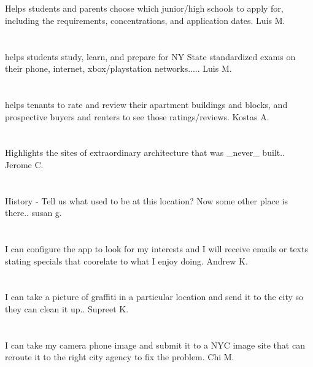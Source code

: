 \section{}Helps students and parents choose which junior/high schools to apply for,  including the requirements,  concentrations,  and application dates. Luis M.
\section{}helps students study,  learn,  and prepare for NY State standardized exams on their phone,  internet,  xbox/playstation networks..... Luis M.
\section{}helps tenants to rate and review their apartment buildings and blocks,  and prospective buyers and renters to see those ratings/reviews. Kostas A.
\section{} Highlights the sites of extraordinary architecture that was \_never\_ built.. Jerome C.
\section{}  History - Tell us what used to be at this location? Now some other place is there.. susan g.
\section{}I can configure the app to look for my interests and I will receive emails or texts stating specials that coorelate to what I enjoy doing. Andrew K.
\section{}I can take a picture of graffiti in a particular location and send it to the city so they can clean it up.. Supreet K.
\section{}I can take my camera phone image and submit it to a NYC image site that can reroute it to the right city agency to fix the problem. Chi  M.
